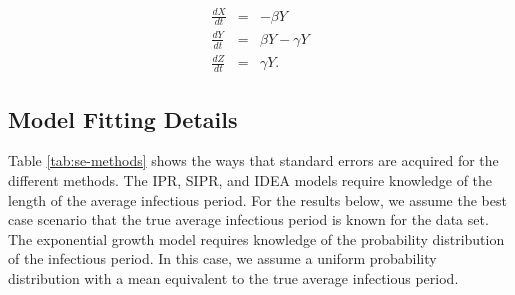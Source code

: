 \documentclass[12pt]{article}
\newcommand{\rr}{\ensuremath{\mathcal{R}_0}}
\begin{document}
\begin{eqnarray*}
	\frac{dX}{dt} &=& -\beta Y \\
	\frac{dY}{dt} &=& \beta Y - \gamma Y \\
	\frac{dZ}{dt} &=& \gamma Y.
\end{eqnarray*}


	
	
	
	
	
	
	
	
	


\subsection{Model Fitting Details}\label{sec:model-fit}

Table \ref{tab:se-methods} shows the ways that standard errors are acquired for the different methods. The IPR, SIPR, and IDEA models require knowledge of the length of the average infectious period. For the results below, we assume the best case scenario that the true average infectious period is known for the data set. The exponential growth model requires knowledge of the probability distribution of the infectious period. In this case, we assume a uniform probability distribution with a mean equivalent to the true average infectious period.
\end{document}
